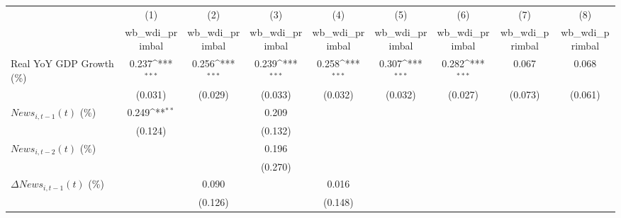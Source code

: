 {
\def\sym#1{\ifmmode^{#1}\else\(^{#1}\)\fi}
\begin{tabular}{l*{8}{c}}
\toprule
                    &\multicolumn{1}{c}{(1)}&\multicolumn{1}{c}{(2)}&\multicolumn{1}{c}{(3)}&\multicolumn{1}{c}{(4)}&\multicolumn{1}{c}{(5)}&\multicolumn{1}{c}{(6)}&\multicolumn{1}{c}{(7)}&\multicolumn{1}{c}{(8)}\\
                    &\multicolumn{1}{c}{wb_wdi_primbal}&\multicolumn{1}{c}{wb_wdi_primbal}&\multicolumn{1}{c}{wb_wdi_primbal}&\multicolumn{1}{c}{wb_wdi_primbal}&\multicolumn{1}{c}{wb_wdi_primbal}&\multicolumn{1}{c}{wb_wdi_primbal}&\multicolumn{1}{c}{wb_wdi_primbal}&\multicolumn{1}{c}{wb_wdi_primbal}\\
\midrule
Real YoY GDP Growth (\%)&       0.237\sym{***}&       0.256\sym{***}&       0.239\sym{***}&       0.258\sym{***}&       0.307\sym{***}&       0.282\sym{***}&       0.067         &       0.068         \\
                    &     (0.031)         &     (0.029)         &     (0.033)         &     (0.032)         &     (0.032)         &     (0.027)         &     (0.073)         &     (0.061)         \\
\addlinespace
$ News_{i,t-1}(t)$ (\%)&       0.249\sym{**} &                     &       0.209         &                     &                     &                     &                     &                     \\
                    &     (0.124)         &                     &     (0.132)         &                     &                     &                     &                     &                     \\
\addlinespace
$ News_{i,t-2}(t)$ (\%)&                     &                     &       0.196         &                     &                     &                     &                     &                     \\
                    &                     &                     &     (0.270)         &                     &                     &                     &                     &                     \\
\addlinespace
$ \Delta News_{i,t-1}(t)$ (\%)&                     &       0.090         &                     &       0.016         &                     &                     &                     &                     \\
                    &                     &     (0.126)         &                     &     (0.148)         &                     &                     &                     &                     \\

\end{tabular}}
